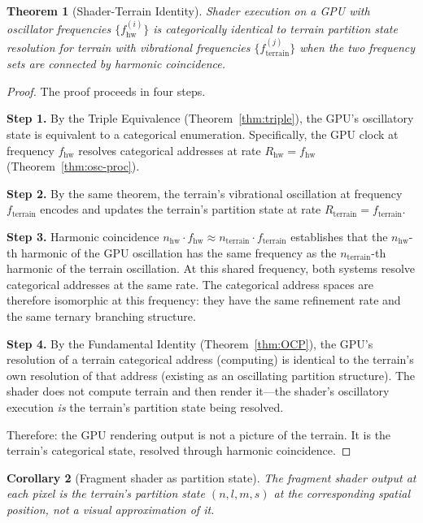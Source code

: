 \documentclass[10pt,twocolumn]{article}
\newtheorem{theorem}{Theorem}[section]
\newtheorem{corollary}[theorem]{Corollary}
\theoremstyle{definition}
\theoremstyle{remark}
\begin{document}
\begin{theorem}[Shader-Terrain Identity]\label{thm:shader}
Shader execution on a GPU with oscillator frequencies
$\{f_{\mathrm{hw}}^{(i)}\}$ is categorically identical to
terrain partition state resolution for terrain with vibrational
frequencies $\{f_{\mathrm{terrain}}^{(j)}\}$ when the two
frequency sets are connected by harmonic coincidence.
\end{theorem}

\begin{proof}
The proof proceeds in four steps.

\medskip\noindent\textbf{Step 1.}
By the Triple Equivalence (Theorem~\ref{thm:triple}),
the GPU's oscillatory state is equivalent to a categorical
enumeration.  Specifically, the GPU clock at frequency
$f_{\mathrm{hw}}$ resolves categorical addresses at rate
$R_{\mathrm{hw}}=f_{\mathrm{hw}}$ (Theorem~\ref{thm:osc-proc}).

\medskip\noindent\textbf{Step 2.}
By the same theorem, the terrain's vibrational oscillation at
frequency $f_{\mathrm{terrain}}$ encodes and updates the
terrain's partition state at rate
$R_{\mathrm{terrain}}=f_{\mathrm{terrain}}$.

\medskip\noindent\textbf{Step 3.}
Harmonic coincidence $n_{\mathrm{hw}}\cdot f_{\mathrm{hw}}
\approx n_{\mathrm{terrain}}\cdot f_{\mathrm{terrain}}$
establishes that the $n_{\mathrm{hw}}$-th harmonic of the
GPU oscillation has the same frequency as the
$n_{\mathrm{terrain}}$-th harmonic of the terrain oscillation.
At this shared frequency, both systems resolve categorical
addresses at the same rate.  The categorical address spaces are
therefore isomorphic at this frequency: they have the same
refinement rate and the same ternary branching structure.

\medskip\noindent\textbf{Step 4.}
By the Fundamental Identity (Theorem~\ref{thm:OCP}),
the GPU's resolution of a terrain categorical address (computing)
is identical to the terrain's own resolution of that address
(existing as an oscillating partition structure).  The shader
does not compute terrain and then render it---the shader's
oscillatory execution \emph{is} the terrain's partition state
being resolved.

Therefore: the GPU rendering output is not a picture of the
terrain.  It is the terrain's categorical state, resolved
through harmonic coincidence.
\end{proof}

\begin{corollary}[Fragment shader as partition state]
\label{cor:fragment}
The fragment shader output at each pixel is the terrain's
partition state $(n,l,m,s)$ at the corresponding spatial
position, not a visual approximation of it.
\end{corollary}
\end{document}
